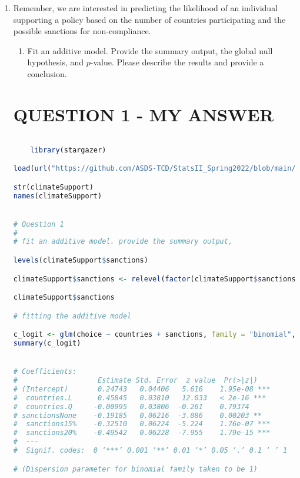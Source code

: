 \documentclass[12pt,letterpaper]{article}
\begin{document}
\begin{enumerate}
	\item
	Remember, we are interested in predicting the likelihood of an individual supporting a policy based on the number of countries participating and the possible sanctions for non-compliance.
	\begin{enumerate}
		\item [] Fit an additive model. Provide the summary output, the global null hypothesis, and $p$-value. Please describe the results and provide a conclusion.
	\end{enumerate}
	
	\section*{QUESTION 1 - MY ANSWER}
	
	\begin{lstlisting}[language=R]
	
	library(stargazer)

load(url("https://github.com/ASDS-TCD/StatsII_Spring2022/blob/main/datasets/climateSupport.RData?raw=true"))

str(climateSupport)
names(climateSupport)


# Question 1
# 
# fit an additive model. provide the summary output,

levels(climateSupport$sanctions)

climateSupport$sanctions <- relevel(factor(climateSupport$sanctions, ordered = F), ref = "5%")

climateSupport$sanctions

# fitting the additive model

c_logit <- glm(choice ~ countries + sanctions, family = "binomial", data = climateSupport)
summary(c_logit)


# Coefficients:
#                   Estimate Std. Error  z value  Pr(>|z|)    
# (Intercept)       0.24743   0.04406   5.616    1.95e-08 ***
#  countries.L      0.45845   0.03810   12.033   < 2e-16 ***
#  countries.Q     -0.00995   0.03806  -0.261    0.79374    
# sanctionsNone    -0.19185   0.06216  -3.086    0.00203 ** 
#  sanctions15%    -0.32510   0.06224  -5.224    1.76e-07 ***
#  sanctions20%    -0.49542   0.06228  -7.955    1.79e-15 ***
#  ---
#  Signif. codes:  0 ‘***’ 0.001 ‘**’ 0.01 ‘*’ 0.05 ‘.’ 0.1 ‘ ’ 1

# (Dispersion parameter for binomial family taken to be 1)


\end{lstlisting}
\end{enumerate}
\end{document}
